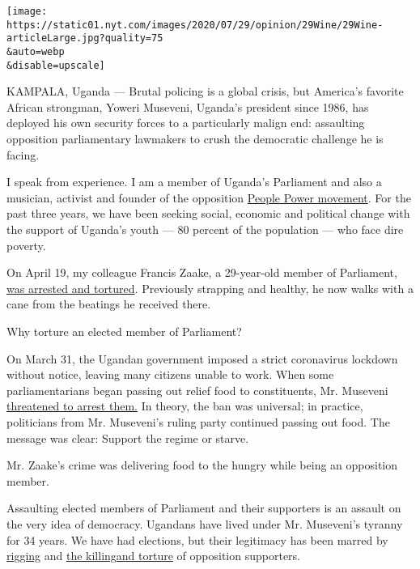 \texttt{[image: https://static01.nyt.com/images/2020/07/29/opinion/29Wine/29Wine-articleLarge.jpg?quality=75\\\&auto=webp\\\&disable=upscale]}

KAMPALA, Uganda --- Brutal policing is a global crisis, but America's
favorite African strongman, Yoweri Museveni, Uganda's president since
1986, has deployed his own security forces to a particularly malign end:
assaulting opposition parliamentary lawmakers to crush the democratic
challenge he is facing.

I speak from experience. I am a member of Uganda's Parliament and also a
musician, activist and founder of the opposition
\href{https://www.thenation.com/article/archive/can-bobi-wine-unite-uganda-and-bring-down-a-dictator/}{People
Power movement}. For the past three years, we have been seeking social,
economic and political change with the support of Uganda's youth --- 80
percent of the population --- who face dire poverty.

On April 19, my colleague Francis Zaake, a 29-year-old member of
Parliament,
\href{https://www.buzzfeednews.com/article/lesterfeder/uganda-francis-zaake-coronavirus}{was
arrested and tortured}. Previously strapping and healthy, he now walks
with a cane from the beatings he received there.

Why torture an elected member of Parliament?

On March 31, the Ugandan government imposed a strict coronavirus
lockdown without notice, leaving many citizens unable to work. When some
parliamentarians began passing out relief food to constituents, Mr.
Museveni
\href{https://www.softpower.ug/covid-19-mps-nsereko-luttamaguzi-risk-being-arrested-for-distributing-food/}{threatened
to arrest them.} In theory, the ban was universal; in practice,
politicians from Mr. Museveni's ruling party continued passing out food.
The message was clear: Support the regime or starve.

Mr. Zaake's crime was delivering food to the hungry while being an
opposition member.

Assaulting elected members of Parliament and their supporters is an
assault on the very idea of democracy. Ugandans have lived under Mr.
Museveni's tyranny for 34 years. We have had elections, but their
legitimacy has been marred by
\href{https://www.nybooks.com/daily/2016/05/16/uganda-cost-of-fake-democracy/}{rigging}
and
\href{https://www.hrw.org/news/2005/12/19/uganda-respect-opposition-right-campaign}{the
killing}\href{https://www.theguardian.com/world/2006/feb/26/uganda.deniscampbell}{and
torture} of opposition supporters.

